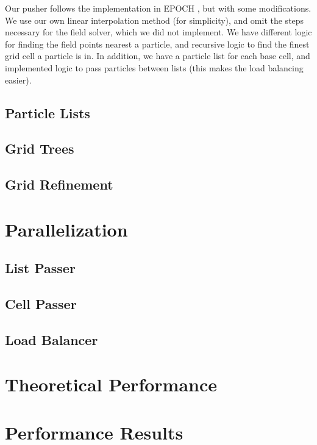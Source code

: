 \documentclass[]{article}
\begin{document}
Our pusher follows the implementation in EPOCH \cite{epoch}, but with some modifications.  We use our own linear interpolation method (for simplicity), and omit the steps necessary for the field solver, which we did not implement.  We have different logic for finding the field points nearest a particle, and recursive logic to find the finest grid cell a particle is in.  In addition, we have a particle list for each base cell, and implemented logic to pass particles between lists (this makes the load balancing easier).

\subsection{Particle Lists}

\subsection{Grid Trees}

\subsection{Grid Refinement}



\section{Parallelization}

\subsection{List Passer}

\subsection{Cell Passer}

\subsection{Load Balancer}


\section{Theoretical Performance}

\section{Performance Results}
\end{document}
